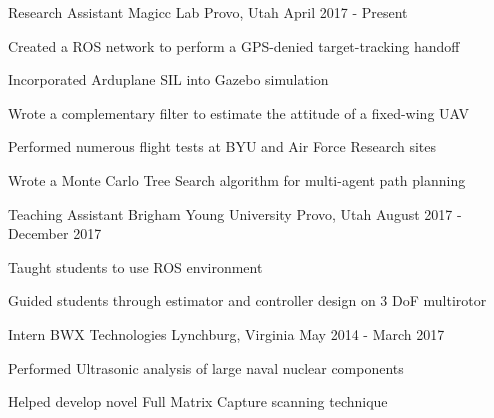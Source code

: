 

\begin{cventries}

  \cventry
    {Research Assistant} %
    {Magicc Lab} %
    {Provo, Utah} %
    {April 2017 - Present} %
    {
      \begin{cvitems} %
      \item  {Created a ROS network to perform a GPS-denied target-tracking handoff}
      \item  {Incorporated Arduplane SIL into Gazebo simulation}
      \item  {Wrote a complementary filter to estimate the attitude of a fixed-wing UAV}
      \item  {Performed numerous flight tests at BYU and Air Force Research sites}
      \item  {Wrote a Monte Carlo Tree Search algorithm for multi-agent path planning}
      \end{cvitems}
    }
  \cventry
    {Teaching Assistant} %
    {Brigham Young University} %
    {Provo, Utah} %
    {August 2017 - December 2017} %
    {
      \begin{cvitems} %
      \item {Taught students to use ROS environment} 
      \item {Guided students through estimator and controller design on 3 DoF multirotor}
      \end{cvitems}
    }
  \cventry
    {Intern} %
    {BWX Technologies} %
    {Lynchburg, Virginia} %
    {May 2014 - March 2017} %
    {
      \begin{cvitems} %
      \item  {Performed Ultrasonic analysis of large naval nuclear components}
      \item  {Helped develop novel Full Matrix Capture scanning technique}
      \end{cvitems}
    }

\end{cventries}
